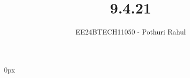 \documentclass[journal]{IEEEtran}
\begin{document}

\vspace{3cm}
\parindent 0px

\title{9.4.21}
\author{EE24BTECH11050 - Pothuri Rahul}
{\let\newpage\relax\maketitle}

\renewcommand{\thefigure}{\theenumi}
\renewcommand{\thetable}{\theenumi}
\setlength{\intextsep}{10pt} %


\renewcommand{\thetable}{\theenumi}
\end{document}
